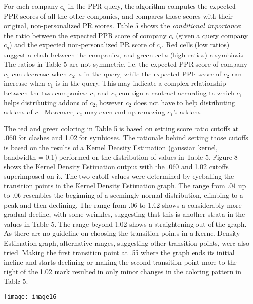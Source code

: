 \documentclass{article} %
\begin{document}
For each company $c_q$ in the PPR query, the algorithm computes the expected PPR scores of all the other companies, and compares those scores with their original, non-personalized PR scores. Table 5 shows the \textit{conditional importance}: the ratio between the expected PPR score of company $c_i$ (given a query company $c_q$) and the expected non-personalized PR score of $c_i$. Red cells (low ratios) suggest a clash between the companies, and green cells (high ratios) a symbiosis. The ratios in Table 5 are not symmetric, i.e. the expected PPR score of company $c_{\mathrm{1}}$ can decrease when $c_{\mathrm{2}}$ is in the query, while the expected PPR score of $c_{\mathrm{2}}$ can increase when $c_{\mathrm{1}}$ is in the query. This may indicate a complex relationship between the two companies: $c_{\mathrm{1}}$ and $c_{\mathrm{2}}$ can sign a contract according to which $c_{\mathrm{1}}$ helps distributing addons of $c_{\mathrm{2}}$, however $c_{\mathrm{2}}$ does not have to help distributing addons of $c_{\mathrm{1}}$. Moreover, $c_{\mathrm{2}}$ may even end up removing $c_{\mathrm{1}}$'s addons.

The red and green coloring in Table 5 is based on setting score ratio cutoffs at .060 for clashes and 1.02 for symbioses.  The rationale behind setting those cutoffs is based on the results of a Kernel Density Estimation (gaussian kernel, bandwidth = 0.1) performed on the distribution of values in Table 5. Figure 8 shows the Kernel Density Estimation output with the .060 and 1.02 cutoffs superimposed on it. The two cutoff values were determined by eyeballing the transition points in the Kernel Density Estimation graph. The range from .04 up to .06 resembles the beginning of a seemingly normal distribution, climbing to a peak and then declining. The range from .06 to 1.02 shows a considerably more gradual decline, with some wrinkles, suggesting that this is another strata in the values in Table 5. The range beyond 1.02 shows a straightening out of the graph. As there are no guideline on choosing the transition points in a Kernel Density Estimation graph, alternative ranges, suggesting other transition points, were also tried. Making the first transition point at .55 where the graph ends its initial incline and starts declining or making the second transition point more to the right of the 1.02 mark resulted in only minor changes in the coloring pattern in Table 5. 



\noindent \texttt{[image: image16]}
\end{document}
